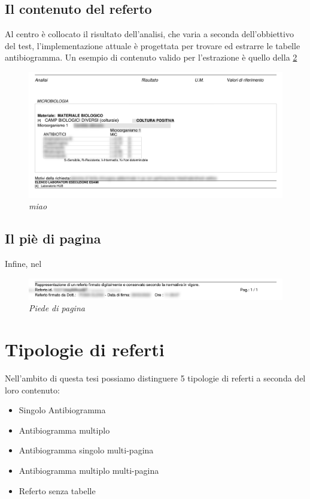 \subsection{Il contenuto del referto}
Al centro è collocato il risultato dell'analisi, che varia a seconda dell'obbiettivo del test, l'implementazione attuale è progettata per trovare ed estrarre le tabelle antibiogramma. Un esempio di contenuto valido per l'estrazione è quello della \ref{fig:content}
\begin{figure}[h!]
	\centering
	\includegraphics[width=.99\columnwidth]{images/content.png}
	\caption{\textit{miao}}
	\label{fig:content}
\end{figure}
\bigskip
\newpage
\subsection{Il piè di pagina}
Infine, nel
\begin{figure}[h!]
	\centering
	\includegraphics[width=.99\columnwidth]{images/footer.png}
	\caption{\textit{Piede di pagina}}
	\label{fig:content}
\end{figure}
\bigskip


\section{Tipologie di referti}
Nell'ambito di questa tesi possiamo distinguere 5 tipologie di referti a seconda del loro contenuto:
\begin{itemize}
	\item Singolo Antibiogramma
	\item Antibiogramma multiplo
	\item Antibiogramma singolo multi-pagina
	\item Antibiogramma multiplo multi-pagina
	\item Referto senza tabelle
\end{itemize}
